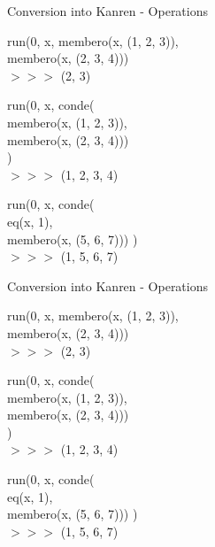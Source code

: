 \documentclass{beamer}
\begin{document}
\begin{frame}{Conversion into Kanren - Operations}
    \color{gray}
    \begin{center}
        run(0, x, membero(x, (1, 2, 3)),\\ membero(x, (2, 3, 4)))\\
        $>>>$ (2, 3)
    \end{center}
    \color{black}
    \begin{center}
        run(0, x, conde(\\
        membero(x, (1, 2, 3)),\\ 
        membero(x, (2, 3, 4)))\\
        )\\
        \color{red}$>>>$ (1, 2, 3, 4)
    \end{center}
    \color{gray}
    \begin{center}
        run(0, x, conde(\\
        eq(x, 1),\\ 
        membero(x, (5, 6, 7)))
        )\\
        $>>>$ (1, 5, 6, 7)
    \end{center}
\end{frame}

\begin{frame}{Conversion into Kanren - Operations}
    \color{gray}
    \begin{center}
        run(0, x, membero(x, (1, 2, 3)),\\ membero(x, (2, 3, 4)))\\
        $>>>$ (2, 3)
    \end{center}

    \begin{center}
        run(0, x, conde(\\
        membero(x, (1, 2, 3)),\\ 
        membero(x, (2, 3, 4)))\\
        )\\
        $>>>$ (1, 2, 3, 4)
    \end{center}
    \color{black}
    \begin{center}
        run(0, x, conde(\\
        eq(x, 1),\\ 
        membero(x, (5, 6, 7)))
        )\\
        \color{red}$>>>$ (1, 5, 6, 7)
    \end{center}
\end{frame}
\end{document}
